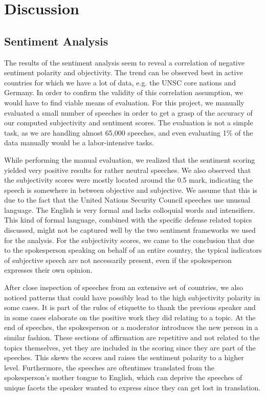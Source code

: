 \section{Discussion}
\label{discuss}

\subsection{Sentiment Analysis}
The results of the sentiment analysis seem to reveal a correlation of negative sentiment polarity and objectivity. The trend can be observed best in active countries for which we have a lot of data, e.g. the UNSC core nations and Germany. In order to confirm the validity of this correlation assumption, we would have to find viable means of evaluation. For this project, we manually evaluated a small number of speeches in order to get a grasp of the accuracy of our computed subjectivity and sentiment scores. The evaluation is not a simple task, as we are handling almost 65,000 speeches, and even evaluating 1\% of the data manually would be a labor-intensive tasks.

While performing the manual evaluation, we realized that the sentiment scoring yielded very positive results for rather neutral speeches. We also observed that the subjectivity scores were mostly located around the 0.5 mark, indicating the speech is somewhere in between objective and subjective. We assume that this is due to the fact that the United Nations Security Council speeches use unusual language. The English is very formal and lacks colloquial words and intensifiers. This kind of formal language, combined with the specific defense related topics discussed, might not be captured well by the two sentiment frameworks we used for the analysis. For the subjectivity scores, we came to the conclusion that due to the spokesperson speaking on behalf of an entire country, the typical indicators of subjective speech are not necessarily present, even if the spokesperson expresses their own opinion.

After close inspection of speeches from an extensive set of countries, we also noticed patterns that could have possibly lead to the high subjectivity polarity in some cases. It is part of the rules of etiquette to thank the previous speaker and in some cases elaborate on the positive work they did relating to a topic. At the end of speeches, the spokesperson or a moderator introduces the new person in a similar fashion. These sections of affirmation are repetitive and not related to the topics themselves, yet they are included in the scoring since they are part of the speeches. This skews the scores and raises the sentiment polarity to a higher level.
Furthermore, the speeches are oftentimes translated from the spokesperson's mother tongue to English, which can deprive the speeches of unique facets the speaker wanted to express since they can get lost in translation. 

